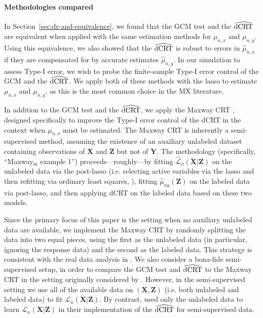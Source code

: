 \documentclass[aos]{imsart}
\theoremstyle{plain}
\theoremstyle{remark}
\newcommand{\prx}{\bm X}								%
\newcommand{\prz}{\bm Z}								%
\newcommand{\pry}{{\bm Y}}								%
\newcommand{\law}{\mathcal L}							%
\newcommand{\lawhat}{\widehat{\mathcal L}}				%
\newcommand{\dCRThat}{\widehat{\textnormal{dCRT}}}		%
\begin{document}
\paragraph*{Methodologies compared}

In Section~\ref{sec:dr-and-equivalence}, we found that the GCM test and the $\dCRThat$ are equivalent when applied with the same estimation methods for $\mu_{n,x}$ and $\mu_{n,y}$. Using this equivalence, we also showed that the $\dCRThat$ is robust to errors in $\widehat \mu_{n,x}$ if they are compensated for by accurate estimates $\widehat \mu_{n,y}$. In our simulation to assess Type-I error, we wish to probe the finite-sample Type-I error control of the GCM and the $\dCRThat$. We apply both of these methods with the lasso to estimate $\mu_{n,x}$ and $\mu_{n,y}$, as this is the most common choice in the MX literature.

In addition to the GCM test and the $\dCRThat$, we apply the Maxway CRT \citep{Li2022}, designed specifically to improve the Type-I error control of the dCRT in the context when $\mu_{n,x}$ must be estimated. The Maxway CRT is inherently a semi-supervised method, assuming the existence of an auxiliary unlabeled dataset containing observations of $\prx$ and $\prz$ but not of $\pry$. The methodology (specifically, ``Maxway$_{\text{in}}$ example 1'') proceeds---roughly---by fitting $\lawhat_n(\prx|\prz)$ on the unlabeled data via the post-lasso (i.e. selecting active variables via the lasso and then refitting via ordinary least squares, \cite{Belloni2013}), fitting $\widehat \mu_{ny}(\prz)$ on the labeled data via post-lasso, and then applying dCRT on the labeled data based on these two models.

Since the primary focus of this paper is the setting when no auxiliary unlabeled data are available, we implement the Maxway CRT by randomly splitting the data into two equal pieces, using the first as the unlabeled data (in particular, ignoring the response data) and the second as the labeled data. This strategy is consistent with the real data analysis in \citet[Section 6]{Li2022}. We also consider a bona-fide semi-supervised setup, in order to compare the GCM test and $\dCRThat$ to the Maxway CRT in the setting originally considered by \citet{Li2022}. However, in the semi-supervised setting we use all of the available data on $(\prx, \prz)$ (i.e. both unlabeled and labeled data) to fit $\law_n(\prx|\prz)$. By contrast, \citet{Li2022} used only the unlabeled data to learn $\law_n(\prx|\prz)$ in their implementation of the $\dCRThat$ for semi-supervised data.
\end{document}
